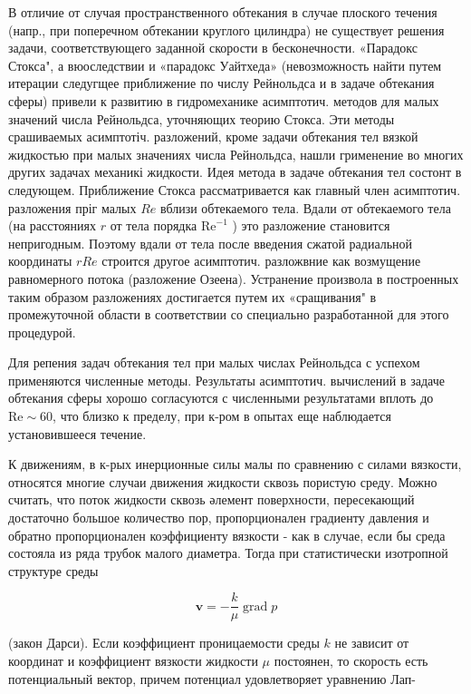 \documentclass[10pt]{article}
\begin{document}
В отличие от случая пространственного обтекания в случае плоского течения (напр., при поперечном обтекании круглого цилиндра) не существует решения задачи, соответствующего заданной скорости в бесконечности. «Парадокс Стокса", а вюоследствии и «парадокс Уайтхеда» (невозможность найти путем итерации следугщее приближение по числу Рейнольдса и в задаче обтекания сферы) привели к развитию в гидромеханике асимптотич. методов для малых значений числа Рейнольдса, уточняющих теорию Стокса. Эти методы срашиваемых асимптотіч. разложений, кроме задачи обтекания тел вязкой жидкостью при малых значениях числа Рейнольдса, нашли грименение во многих других задачах механикі жидкости. Идея метода в задаче обтекания тел состонт в следующем. Приближение Стокса рассматривается как главный член асимптотич. разложения пріг малых $R e$ вблизи обтекаемого тела. Вдали от обтекаемого тела (на расстояниях $r$ от тела порядка $\mathrm{Re}^{-1}$ ) это разложение становится непригодным. Поэтому вдали от тела после введения сжатой радиальной координаты $r R e$ строится другое асимптотич. разложвние как возмущение равномерного потока (разложение Озеена). Устранение произвола в построенных таким образом разложениях достигается путем их «сращивания" в промежуточной области в соответствии со специально разработанной для этого процедурой.



Для репения задач обтекания тел при малых числах Рейнольдса с успехом применяются численные методы. Результаты асимптотич. вычислений в задаче обтекания сферы хорошо согласуются с численными результатами вплоть до $\mathrm{Re} \sim 60$, что близко к пределу, при к-ром в опытах еще наблюдается установившееся течение.



К движениям, в к-рых инерционные силы малы по сравнению с силами вязкости, относятся многие случаи движения жидкости сквозь пористую среду. Можно считать, что поток жидкости сквозь әлемент поверхности, пересекающий достаточно большое количество пор, пропорционален градиенту давления и обратно пропорционален коэффициенту вязкости - как в случае, если бы среда состояла из ряда трубок малого диаметра. Тогда при статистически изотропной структуре среды



\[

\boldsymbol{v}=-\frac{k}{\mu} \operatorname{grad} p

\]



(закон Дарси). Если коэффициент проницаемости среды $k$ не зависит от координат и коэффициент вязкости жидкости $\mu$ постоянен, то скорость есть потенциальный вектор, причем потенциал удовлетворяет уравнению Лап-
\end{document}
